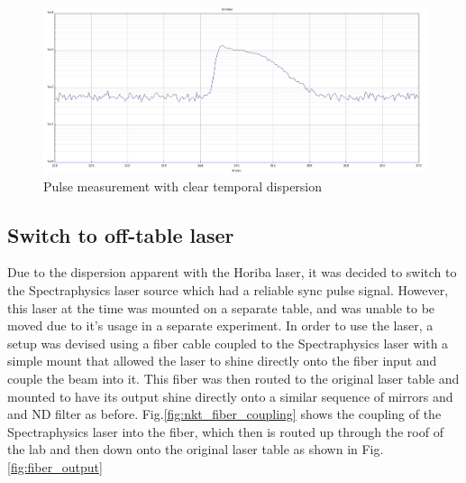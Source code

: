 \documentclass[a4paper]{article}
\begin{document}
\begin{figure}
\centering
\includegraphics[width=1.0\textwidth]{figures/horiba laser.PNG}
\caption{\label{fig:pulse_1}Pulse measurement with clear temporal dispersion}
\end{figure}

\subsection{Switch to off-table laser}

Due to the dispersion apparent with the Horiba laser, it was decided to switch to the Spectraphysics laser source which had a reliable sync pulse signal. However, this laser at the time was mounted on a separate table, and was unable to be moved due to it's usage in a separate experiment. In order to use the laser, a setup was devised using a fiber cable coupled to the Spectraphysics laser with a simple mount that allowed the laser to shine directly onto the fiber input and couple the beam into it. This fiber was then routed to the original laser table and mounted to have its output shine directly onto a similar sequence of mirrors and and ND filter as before. Fig.\ref{fig:nkt_fiber_coupling} shows the coupling of the Spectraphysics laser into the fiber, which then is routed up through the roof of the lab and then down onto the original laser table as shown in Fig.\ref{fig:fiber_output}
\end{document}
